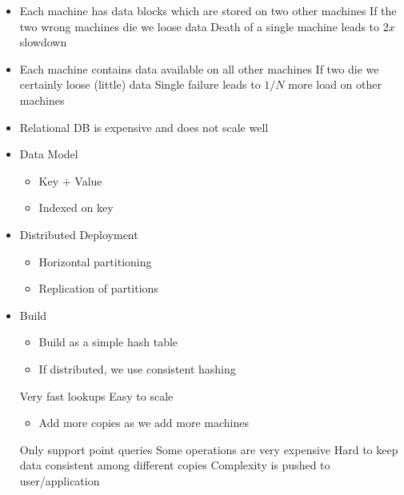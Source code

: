 \begin{itemize}
\begin{itemize}
\begin{itemize}
\begin{itemize}
                            \item Each machine has data blocks which are stored on two other machines
                            \icon If the two wrong machines die we loose data
                            \icon Death of a single machine leads to $2x$ slowdown
                        \end{itemize}
                        \begin{itemize}
                            \item Each machine contains data available on all other machines
                            \icon If two die we certainly loose (little) data
                            \icon Single failure leads to $1/N$ more load on other machines
                        \end{itemize}
                \end{itemize}
        \end{itemize}
        \begin{itemize}
            \item Relational DB is expensive and does not scale well
            \item Data Model
                \begin{itemize}
                    \item Key $+$ Value
                    \item Indexed on key
                \end{itemize}
            \item Distributed Deployment
                \begin{itemize}
                    \item Horizontal partitioning
                    \item Replication of partitions
                \end{itemize}
            \item Build
                \begin{itemize}
                    \item Build as a simple hash table
                    \item If distributed, we use consistent hashing
                \end{itemize}
            \ipro Very fast lookups
            \ipro Easy to scale
                \begin{itemize}
                    \item Add more copies as we add more machines
                \end{itemize}
            \icon Only support point queries
            \icon Some operations are very expensive
            \icon Hard to keep data consistent among different copies
            \icon Complexity is pushed to user/application
        \end{itemize}
\end{itemize}

